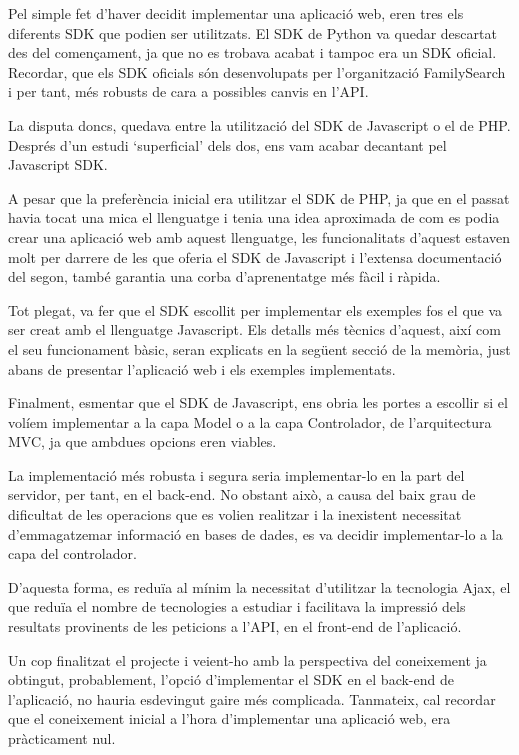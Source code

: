     Pel simple fet d'haver decidit implementar una aplicació web, eren tres els di\-fe\-rents SDK que podien ser utilitzats. El SDK de Python va quedar descartat des del començament, ja que no es trobava acabat i tampoc era un SDK oficial. Recordar, que els SDK oficials són desenvolupats per l'organització FamilySearch i per tant, més robusts de cara a possibles canvis en l’API.

    La disputa doncs, quedava entre la utilització del SDK de Javascript o el de PHP. Després d’un estudi `superficial’ dels dos, ens vam acabar decantant pel Javascript SDK.

    A pesar que la preferència inicial era utilitzar el SDK de PHP, ja que en el passat havia tocat una mica el llenguatge i tenia una idea aproximada de com es podia crear una aplicació web amb aquest llenguatge, les funcionalitats d'aquest estaven molt per darrere de les que oferia el SDK de Javascript i l'extensa documentació del segon, també garantia una corba d'aprenentatge més fàcil i ràpida.

    Tot plegat, va fer que el SDK escollit per implementar els exemples fos el que va ser creat amb el llenguatge Javascript. Els detalls més tècnics d'aquest, així com el seu funcionament bàsic, seran explicats en la següent secció de la memòria, just abans de presentar l’aplicació web i els exemples implementats.

    Finalment, esmentar que el SDK de Javascript, ens obria les portes a escollir si el volíem implementar a la capa Model o a la capa Controlador, de l'arquitectura MVC, ja que ambdues opcions eren viables.

    La implementació més robusta i segura seria implementar-lo en la part del servidor, per tant, en el back-end. No obstant això, a causa del baix grau de dificultat de les operacions que es volien realitzar i la inexistent necessitat d’emmagatzemar informació en bases de dades, es va decidir implementar-lo a la capa del controlador.

    D'aquesta forma, es reduïa al mínim la necessitat d’utilitzar la tecnologia Ajax, el que reduïa el nombre de tecnologies a estudiar i facilitava la impressió dels resultats provinents de les peticions a l’API, en el front-end de l'aplicació.

    Un cop finalitzat el projecte i veient-ho amb la perspectiva del coneixement ja obtingut, probablement, l’opció d’implementar el SDK en el back-end de l’aplicació, no hauria esdevingut gaire més complicada. Tanmateix, cal recordar que el coneixement inicial a l’hora d’implementar una aplicació web, era pràcticament nul.
